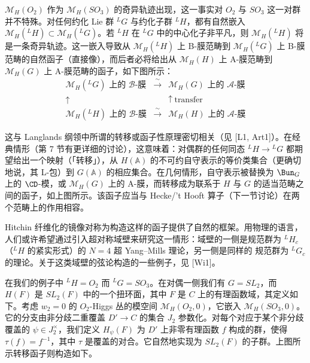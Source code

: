 $\mathcal{M}_H(O_2)$ 作为 $\mathcal{M}_H(SO_3)$ 的奇异轨迹出现，这一事实对 $O_2$ 与 $SO_3$ 这一对群并不特殊。对任何约化 Lie 群 ${}^{L}G$ 与约化子群 ${}^{L}H$，都有自然嵌入 $\mathcal{M}_H({}^{L}H)\subset\mathcal{M}_H({}^{L}G)$。若 ${}^{L}H$ 在 ${}^{L}G$ 中的中心化子非平凡，则 $\mathcal{M}_H({}^{L}H)$ 将是一条奇异轨迹。这一嵌入导致从 $\mathcal{M}_H({}^{L}H)$ 上 B-膜范畴到 $\mathcal{M}_H({}^{L}G)$ 上 B-膜范畴的自然函子（直接像），而后者必将给出从 $\mathcal{M}_H(H)$ 上 A-膜范畴到 $\mathcal{M}_H(G)$ 上 A-膜范畴的函子，如下图所示：
\[
\begin{array}{ccc}
\mathcal{M}_H({}^{L}G)\text{ 上的 }\mathcal{B}\text{-膜} & \xrightarrow{\ \sim\ } & \mathcal{M}_H(G)\text{ 上的 }\mathcal{A}\text{-膜}\\[10pt]
\uparrow & & \uparrow\ \text{transfer}\\[10pt]
\mathcal{M}_H({}^{L}H)\text{ 上的 }\mathcal{B}\text{-膜} & \xrightarrow{\ \sim\ } & \mathcal{M}_H(H)\text{ 上的 }\mathcal{A}\text{-膜}
\end{array}
\]

这与 Langlands 纲领中所谓的转移或函子性原理密切相关（见 [L1, Art1]）。在经典情形（第 7 节有更详细的讨论），这意味着：对偶群的任何同态 ${}^{L}H\to{}^{L}G$ 都期望给出一个映射（「转移」），从 $H(\mathbb{A})$ 的不可约自守表示的等价类集合（更确切地说，其 L-包）到 $G(\mathbb{A})$ 的相应集合。在几何情形，自守表示被替换为 $\Bun_G$ 上的 $\CD$-模，或 $\mathcal{M}_H(G)$ 上的 A-膜，而转移成为联系于 $H$ 与 $G$ 的适当范畴之间的函子，如上图所示。该函子应当与 Hecke/'t Hooft 算子（下一节讨论）在两个范畴上的作用相容。

Hitchin 纤维化的镜像对称为构造这样的函子提供了自然的框架。用物理的语言，人们或许希望通过引入超对称域壁来研究这一情形：域壁的一侧是规范群为 ${}^{L}H_c$（${}^{L}H$ 的紧实形式）的 $N=4$ 超 Yang--Mills 理论，另一侧是同样的
规范群为 ${}^{L}G_c$ 的理论。关于这类域壁的弦论构造的一些例子，见 [Wi1]。

在我们的例子中 ${}^{L}H = O_2$ 而 ${}^{L}G = SO_3$。在对偶一侧我们有 $G = SL_2$，而 $H(F)$ 是 $SL_2(F)$ 中的一个扭环面，其中 $F$ 是 $C$ 上的有理函数域，其定义如下。考虑 $w_2=0$ 的 $O_2$-Higgs 丛的模空间 $\mathcal{M}_H(O_2,0)$，它嵌入 $\mathcal{M}_H(SO_3,0)$。它的分支由非分歧二重覆盖 $D'\to C$ 的集合 $J_2$ 参数化。对每个对应于某个非分歧覆盖的 $\psi\in J_2^\times$，我们定义 $H_\psi(F)$ 为 $D'$ 上非零有理函数 $f$ 构成的群，使得 $\tau(f) = f^{-1}$，其中 $\tau$ 是覆盖的对合。它自然地实现为 $SL_2(F)$ 的子群。上图所示转移函子则构造如下。

